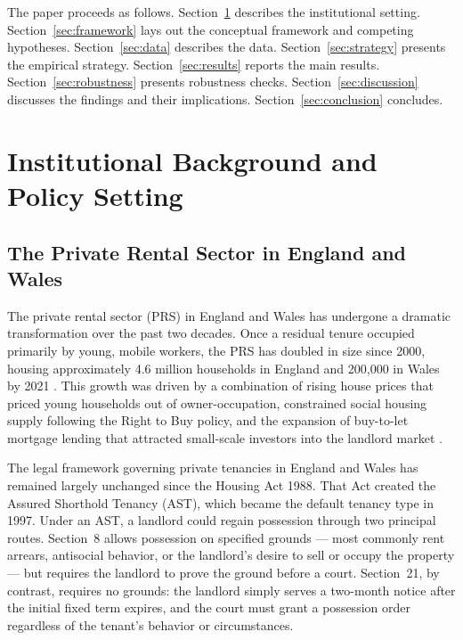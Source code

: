 \documentclass[12pt]{article}
\begin{document}
The paper proceeds as follows. Section~\ref{sec:background} describes the institutional setting. Section~\ref{sec:framework} lays out the conceptual framework and competing hypotheses. Section~\ref{sec:data} describes the data. Section~\ref{sec:strategy} presents the empirical strategy. Section~\ref{sec:results} reports the main results. Section~\ref{sec:robustness} presents robustness checks. Section~\ref{sec:discussion} discusses the findings and their implications. Section~\ref{sec:conclusion} concludes.


\section{Institutional Background and Policy Setting}
\label{sec:background}

\subsection{The Private Rental Sector in England and Wales}

The private rental sector (PRS) in England and Wales has undergone a dramatic transformation over the past two decades. Once a residual tenure occupied primarily by young, mobile workers, the PRS has doubled in size since 2000, housing approximately 4.6 million households in England and 200,000 in Wales by 2021 \citep{scanlon2015private}. This growth was driven by a combination of rising house prices that priced young households out of owner-occupation, constrained social housing supply following the Right to Buy policy, and the expansion of buy-to-let mortgage lending that attracted small-scale investors into the landlord market \citep{whitehead2016supply, crook2011private}.

The legal framework governing private tenancies in England and Wales has remained largely unchanged since the Housing Act 1988. That Act created the Assured Shorthold Tenancy (AST), which became the default tenancy type in 1997. Under an AST, a landlord could regain possession through two principal routes. Section~8 allows possession on specified grounds --- most commonly rent arrears, antisocial behavior, or the landlord's desire to sell or occupy the property --- but requires the landlord to prove the ground before a court. Section~21, by contrast, requires no grounds: the landlord simply serves a two-month notice after the initial fixed term expires, and the court must grant a possession order regardless of the tenant's behavior or circumstances.
\end{document}
